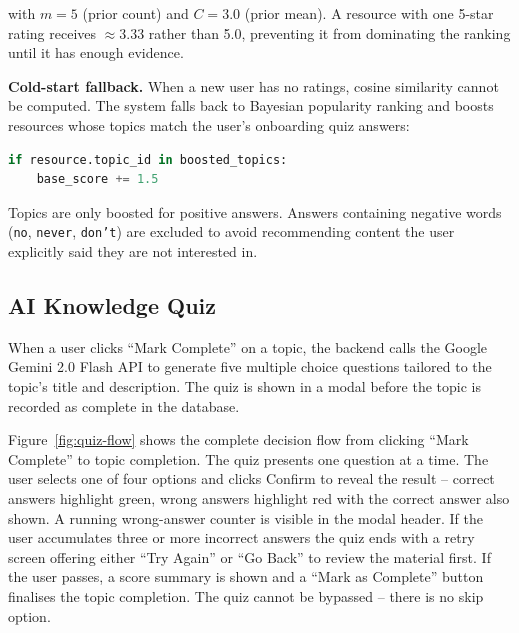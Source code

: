 \documentclass[12pt,a4paper]{report}
\begin{document}
with $m = 5$ (prior count) and $C = 3.0$ (prior mean). A resource with one 5-star rating receives $\approx 3.33$ rather than 5.0, preventing it from dominating the ranking until it has enough evidence.

\textbf{Cold-start fallback.} When a new user has no ratings, cosine similarity cannot be computed. The system falls back to Bayesian popularity ranking and boosts resources whose topics match the user's onboarding quiz answers:

\begin{lstlisting}[language=Python, caption=Cold-start topic boosting]
if resource.topic_id in boosted_topics:
    base_score += 1.5
\end{lstlisting}

Topics are only boosted for positive answers. Answers containing negative words (\texttt{no}, \texttt{never}, \texttt{don't}) are excluded to avoid recommending content the user explicitly said they are not interested in.

\subsection{AI Knowledge Quiz}
\label{sec:impl-quiz}

When a user clicks ``Mark Complete'' on a topic, the backend calls the Google Gemini 2.0 Flash API \cite{gemini2024} to generate five multiple choice questions tailored to the topic's title and description. The quiz is shown in a modal before the topic is recorded as complete in the database.

Figure~\ref{fig:quiz-flow} shows the complete decision flow from clicking ``Mark Complete'' to topic completion. The quiz presents one question at a time. The user selects one of four options and clicks Confirm to reveal the result -- correct answers highlight green, wrong answers highlight red with the correct answer also shown. A running wrong-answer counter is visible in the modal header. If the user accumulates three or more incorrect answers the quiz ends with a retry screen offering either ``Try Again'' or ``Go Back'' to review the material first. If the user passes, a score summary is shown and a ``Mark as Complete'' button finalises the topic completion. The quiz cannot be bypassed -- there is no skip option.
\end{document}
